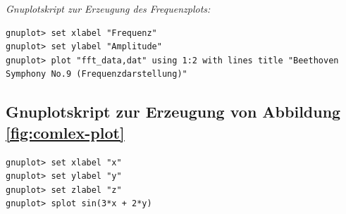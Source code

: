\documentclass[paper=a4,fontsize=12pt,ngerman]{scrartcl}
\begin{document}
\textit{Gnuplotskript zur Erzeugung des Frequenzplots:}
\begin{lstlisting}
gnuplot> set xlabel "Frequenz"
gnuplot> set ylabel "Amplitude"
gnuplot> plot "fft_data,dat" using 1:2 with lines title "Beethoven Symphony No.9 (Frequenzdarstellung)"
\end{lstlisting}

\newpage

\subsection{Gnuplotskript zur Erzeugung von Abbildung \ref{fig:comlex-plot}}
\begin{lstlisting}
gnuplot> set xlabel "x"
gnuplot> set ylabel "y"
gnuplot> set zlabel "z"
gnuplot> splot sin(3*x + 2*y)
\end{lstlisting}

\clearpage
\renewcommand\refname{Literaturverzeichnis}




\clearpage
\end{document}
